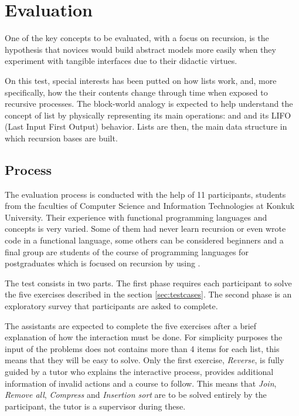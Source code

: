 
\section{Evaluation}

One of the key concepts to be evaluated, with a focus on recursion, is
the hypothesis that novices would build abstract models more easily
when they experiment with tangible interfaces due to their didactic
virtues.

On this test, special interests has been putted on how lists work,
and, more specifically, how the their contents change through time
when exposed to recursive processes. The block\hyp{}world analogy is
expected to help understand the concept of list by physically
representing its main operations: \pop and \push and its LIFO (Last
Input First Output) behavior. Lists are then, the main data structure
in which recursion bases are built.

\subsection{Process}

The evaluation process is conducted with the help of 11 participants,
students from the faculties of Computer Science and Information
Technologies at Konkuk University. Their experience with functional
programming languages and concepts is very varied. Some of them had
never learn recursion or even wrote code in a functional language,
some others can be considered beginners and a final group are students
of the course of programming languages for postgraduates which is
focused on recursion by using \erlang.

The test consists in two parts. The first phase requires each
participant to solve the five exercises described in the section
\vref{sec:testcases}. The second phase is an exploratory survey that
participants are asked to complete.

The assistants are expected to complete the five exercises after a
brief explanation of how the interaction must be done. For simplicity
purposes the input of the problems does not contains more than 4 items
for each list, this means that they will be easy to solve. Only the
first exercise, \emph{Reverse}, is fully guided by a tutor who
explains the interactive process, provides additional information of
invalid actions and a course to follow. This means that \emph{Join},
\emph{Remove all}, \emph{Compress} and \emph{Insertion sort} are to be
solved entirely by the participant, the tutor is a supervisor during
these.

